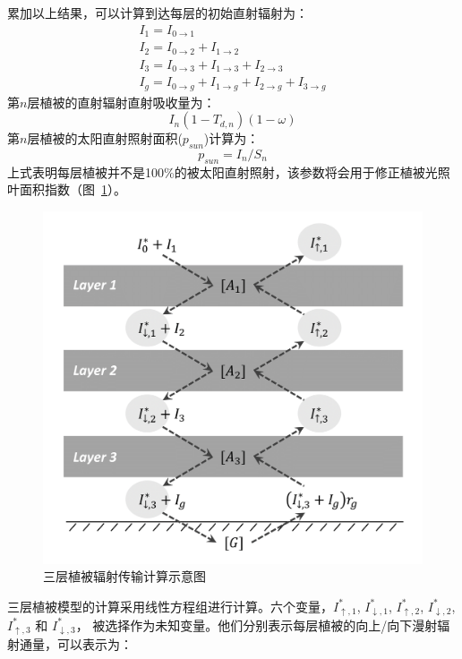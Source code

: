 累加以上结果，可以计算到达每层的初始直射辐射为：
\begin{equation}
\begin{array}{l}I_{1}=I_{0 \rightarrow 1} \\ I_{2}=I_{0 \rightarrow 2}+I_{1 \rightarrow 2} \\ 
    I_{3}=I_{0 \rightarrow 3}+I_{1 \rightarrow 3}+I_{2 \rightarrow 3} \\ 
    I_{g}=I_{0 \rightarrow g}+I_{1 \rightarrow g}+I_{2 \rightarrow g}+I_{3 \rightarrow g}\end{array}
\end{equation}
第$n$层植被的直射辐射直射吸收量为：
\begin{equation}
I_{n}\left(1-T_{d, n}\right)(1-\omega)
\end{equation}
第$n$层植被的太阳直射照射面积($p_{sun}$)计算为：
\begin{equation}
p_{sun}=I_{n} / S_{n}
\end{equation}
上式表明每层植被并不是100\%的被太阳直射照射，该参数将会用于修正植被光照叶面积指数（图~\ref{fig:三层植被辐射传输计算示意图}）。
{
\begin{figure}[htbp]
\centering
\includegraphics[width=0.7\columnwidth]{Figures/辐射过程及辐射通量计算/三层植被辐射传输计算示意图.png}
\caption{三层植被辐射传输计算示意图}
\label{fig:三层植被辐射传输计算示意图}
\end{figure}
}
三层植被模型的计算采用线性方程组进行计算。六个变量，$I_{\uparrow,1}^\ast$, $I_{\downarrow,1}^\ast$, $I_{\uparrow,2}^\ast$, $I_{\downarrow,2}^\ast$, $I_{\uparrow,3}^\ast$ 和 $I_{\downarrow,3}^\ast$，
被选择作为未知变量。他们分别表示每层植被的向上/向下漫射辐射通量，可以表示为：
